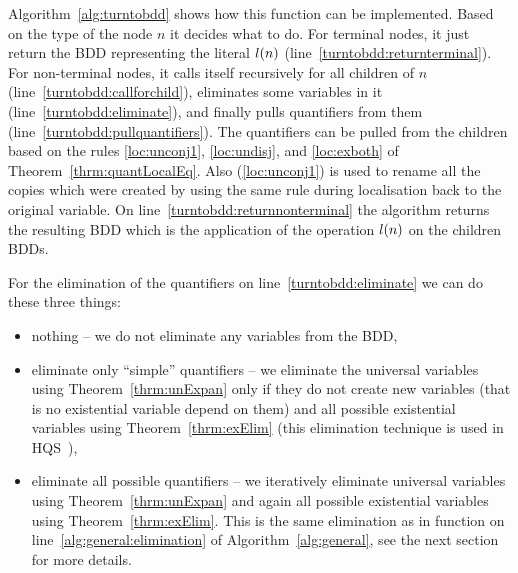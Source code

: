 \documentclass[
  digital, %
  twoside, %
  table,   %
  nolof,     %
  nolot,     %
]{fithesis3}
\theoremstyle{definition}
\theoremstyle{remark}
\begin{document}
Algorithm~\ref{alg:turntobdd} shows how this function can be implemented. Based on the type of the node $n$ it decides what to do. For terminal nodes, it just return the BDD representing the literal $l({n})$ (line~\ref{turntobdd:returnterminal}). For non-terminal nodes, it calls itself recursively for all children of $n$ (line~\ref{turntobdd:callforchild}), eliminates some variables in it (line~\ref{turntobdd:eliminate}), and finally pulls quantifiers from them (line~\ref{turntobdd:pullquantifiers}). The quantifiers can be pulled from the children based on the rules \eqref{loc:unconj1}, \eqref{loc:undisj}, and \eqref{loc:exboth} of Theorem~\ref{thrm:quantLocalEq}. Also (\ref{loc:unconj1}) is used to rename all the copies which were created by using the same rule during localisation back to the original variable. 
On line~\ref{turntobdd:returnnonterminal} the algorithm returns the resulting BDD which is the application of the operation $l({n})$ on the children BDDs.

For the elimination of the quantifiers on line~\ref{turntobdd:eliminate} we can do these three things:
\begin{itemize}
    \item nothing -- we do not eliminate any variables from the BDD,
    \item eliminate only ``simple'' quantifiers -- we eliminate the universal variables using Theorem~\ref{thrm:unExpan} only if they do not create new variables (that is no existential variable depend on them) and all possible existential variables using Theorem~\ref{thrm:exElim} (this elimination technique is used in HQS~\cite{HQSquantifierLocalization}), %
    \item eliminate all possible quantifiers -- we iteratively eliminate universal variables using Theorem~\ref{thrm:unExpan} and again all possible existential variables using Theorem~\ref{thrm:exElim}. This is the same elimination as in function  on line~\ref{alg:general:elimination} of Algorithm~\ref{alg:general}, see the next section for more details. %
\end{itemize}
\end{document}
